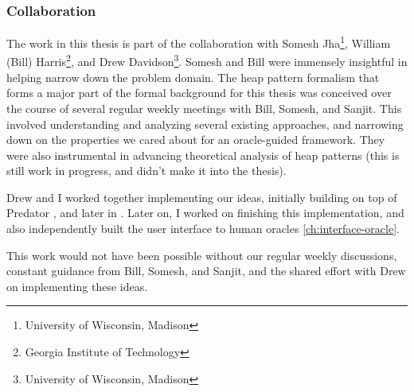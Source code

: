 \subsubsection{Collaboration}
The work in this thesis is part of the collaboration with Somesh
Jha\footnote{University of Wisconsin, Madison}, William (Bill)
Harris\footnote{Georgia Institute of Technology}, and Drew
Davidson\footnote{University of Wisconsin, Madison}. Somesh and Bill were immensely
insightful in helping narrow down the problem domain.
The heap pattern formalism that forms a major part of the formal background for this
thesis was conceived over the course of several regular weekly meetings with Bill, Somesh,
and Sanjit. This involved understanding and analyzing several existing approaches, and
narrowing down on the properties we cared about for an oracle-guided framework. They
were also instrumental in advancing theoretical analysis of heap patterns
(this is still work in progress, and didn't make it into the thesis).

Drew and I worked together implementing our ideas, initially building on top
of Predator \cite{dudka13}, and later in \cpachecker \cite{cpachecker}. Later on,
I worked on finishing this implementation, and also independently built the
user interface to human oracles \autoref{ch:interface-oracle}.

This work would not have been possible without our regular weekly discussions, constant
guidance from Bill, Somesh, and Sanjit, and the shared effort with Drew on implementing
these ideas.

